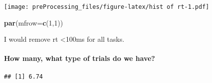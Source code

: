 \documentclass[
]{article}
\newenvironment{Shaded}{\begin{snugshade}}{\end{snugshade}}
\newcommand{\DataTypeTok}[1]{\textcolor[rgb]{0.13,0.29,0.53}{#1}}
\newcommand{\DecValTok}[1]{\textcolor[rgb]{0.00,0.00,0.81}{#1}}
\newcommand{\KeywordTok}[1]{\textcolor[rgb]{0.13,0.29,0.53}{\textbf{#1}}}
\newcommand{\NormalTok}[1]{#1}
\newcommand{\OperatorTok}[1]{\textcolor[rgb]{0.81,0.36,0.00}{\textbf{#1}}}
\newcommand{\StringTok}[1]{\textcolor[rgb]{0.31,0.60,0.02}{#1}}
\begin{document}
\texttt{[image: preProcessing\_files/figure-latex/hist of rt-1.pdf]}

\begin{Shaded}
\begin{Highlighting}[]
\KeywordTok{par}\NormalTok{(}\DataTypeTok{mfrow=}\KeywordTok{c}\NormalTok{(}\DecValTok{1}\NormalTok{,}\DecValTok{1}\NormalTok{))}
\end{Highlighting}
\end{Shaded}

I would remove rt \textless100ms for all tasks.

\hypertarget{how-many-what-type-of-trials-do-we-have}{%
\paragraph{How many, what type of trials do we
have?}\label{how-many-what-type-of-trials-do-we-have}}

\begin{Shaded}
\end{Shaded}

\begin{verbatim}
## [1] 6.74
\end{verbatim}
\end{document}
